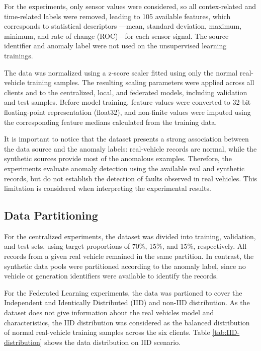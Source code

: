 \documentclass[12pt]{article}
\begin{document}
For the experiments, only sensor values were considered, so all contex-related and time-related labels were removed, leading to 105 available features, which corresponds to statistical descriptors —mean, standard deviation, maximum, minimum, and rate of change (ROC)—for each sensor signal. The source identifier and anomaly label were not used on the unsupervised learning trainings.

The data was normalized using a z-score scaler fitted using only the normal real-vehicle training samples. The resulting scaling parameters were applied across all clients and to the centralized, local, and federated models, including validation and test samples. Before model training, feature values were converted to 32-bit floating-point representation (float32), and non-finite values were imputed using the corresponding feature medians calculated from the training data.

It is important to notice that the dataset presents a strong association between the data source and the anomaly labels: real-vehicle records are normal, while the synthetic sources provide most of the anomalous examples. Therefore, the experiments evaluate anomaly detection using the available real and synthetic records, but do not establish the detection of faults observed in real vehicles. This limitation is considered when interpreting the experimental results.

\subsection{Data Partitioning}

For the centralized experiments, the dataset was divided into training, validation, and test sets, using target proportions of 70\%, 15\%, and 15\%, respectively. All records from a given real vehicle remained in the same partition. In contrast, the synthetic data pools were partitioned according to the anomaly label, since no vehicle or generation identifiers were available to identify the records.

For the Federated Learning experiments, the data was partioned to cover the  Independent and Identically Distributed (IID) and non-IID distribution. As the dataset does not give information about the real vehicles model and characteristics, the IID distribution was considered as the balanced distribution of normal real-vehicle training samples across the six clients. Table \ref{tab:IID-distribution} shows the data distribution on IID scenario.
\end{document}
